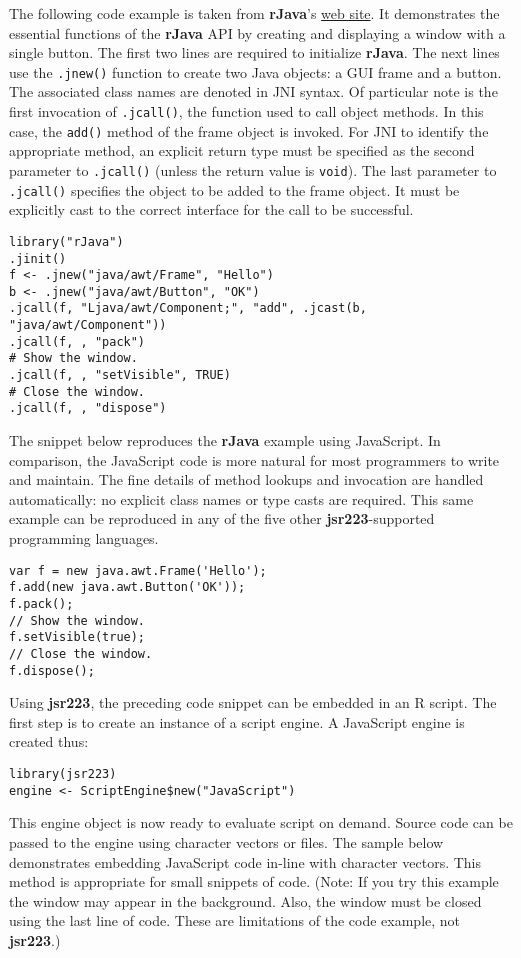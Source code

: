 The following code example is taken from \textbf{rJava}'s \href{http://www.rforge.net/rJava/}{web site}. It demonstrates the essential functions of the \textbf{rJava} API by creating and displaying a window with a single button. The first two lines are required to initialize \textbf{rJava}. The next lines use the \texttt{.jnew()} function to create two Java objects: a GUI frame and a button. The associated class names are denoted in JNI syntax. Of particular note is the first invocation of \texttt{.jcall()}, the function used to call object methods. In this case, the \texttt{add()} method of the frame object is invoked. For JNI to identify the appropriate method, an explicit return type must be specified as the second parameter to \texttt{.jcall()} (unless the return value is \texttt{void}). The last parameter to \texttt{.jcall()} specifies the object to be added to the frame object. It must be explicitly cast to the correct interface for the call to be successful.

\singlespace
\begin{verbatim}
library("rJava")
.jinit()
f <- .jnew("java/awt/Frame", "Hello")
b <- .jnew("java/awt/Button", "OK")
.jcall(f, "Ljava/awt/Component;", "add", .jcast(b, "java/awt/Component"))
.jcall(f, , "pack")
# Show the window.
.jcall(f, , "setVisible", TRUE)
# Close the window.
.jcall(f, , "dispose")
\end{verbatim}
\doublespace

The snippet below reproduces the \textbf{rJava} example using JavaScript. In comparison, the JavaScript code is more natural for most programmers to write and maintain. The fine details of method lookups and invocation are handled automatically: no explicit class names or type casts are required. This same example can be reproduced in any of the five other \textbf{jsr223}-supported programming languages.

\singlespace
\begin{verbatim}
var f = new java.awt.Frame('Hello');
f.add(new java.awt.Button('OK'));
f.pack();
// Show the window.
f.setVisible(true);
// Close the window.
f.dispose();
\end{verbatim}
\doublespace

Using \textbf{jsr223}, the preceding code snippet can be embedded in an R script. The first step is to create an instance of a script engine. A JavaScript engine is created thus:

\singlespace
\begin{verbatim}
library(jsr223)
engine <- ScriptEngine$new("JavaScript")
\end{verbatim}
\doublespace
This engine object is now ready to evaluate script on demand. Source code can be passed to the engine using character vectors or files. The sample below demonstrates embedding JavaScript code in-line with character vectors. This method is appropriate for small snippets of code. (Note: If you try this example the window may appear in the background. Also, the window must be closed using the last line of code. These are limitations of the code example, not \textbf{jsr223}.)

